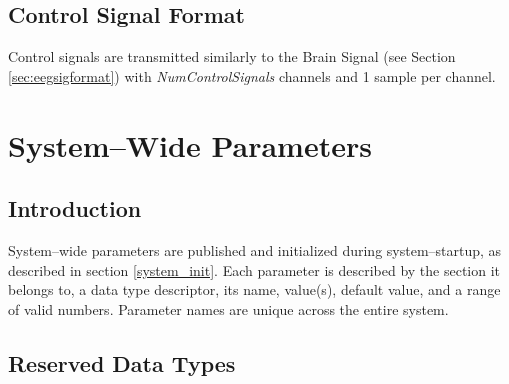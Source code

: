 \documentclass[letterpaper,oneside,12pt]{book}
\begin{document}
\subsection{Control Signal Format}

Control signals are transmitted similarly to the Brain Signal (see Section 
\ref{sec:eegsigformat}) with \textit{NumControlSignals} channels and 1 sample 
per channel.


\section{System--Wide Parameters}
\label{system_params}

\subsection{Introduction}

System--wide parameters are published and initialized during system--startup, as 
described in section \ref{system_init}. Each parameter is described by the 
section it belongs to, a data type descriptor, its name, value(s), default 
value, and a range of valid numbers. Parameter names are unique across the 
entire system.

\subsection{Reserved Data Types}

\vspace{.5cm}
\end{document}
